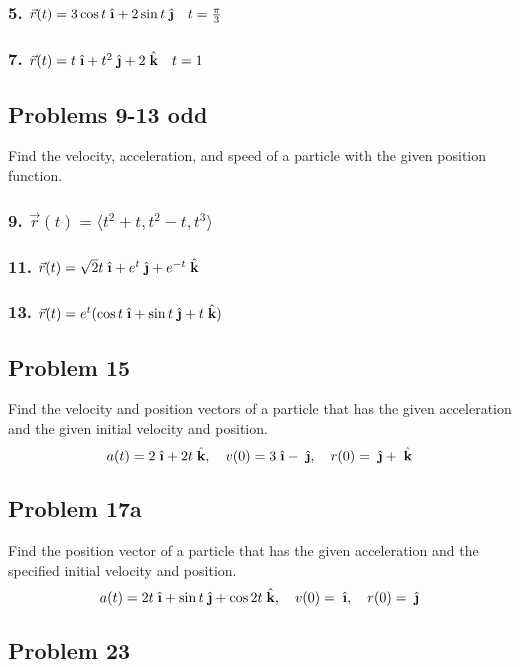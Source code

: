 \documentclass{article}
\newcommand{\ihat}{\;\hat{\textbf{\i}}}
\newcommand{\jhat}{\;\hat{\textbf{\j}}}
\newcommand{\khat}{\;\hat{\textbf{k}}}
\newcommand{\rvec}{\vec{r}(t)}
\begin{document}
\subsubsection*{5. $\rvec = 3 \cos t \ihat + 2 \sin t \jhat \quad t = \frac \pi 3 $}
\subsubsection*{7. $\rvec = t\ihat + t^2\jhat + 2\khat \quad t = 1$}
\subsection*{Problems 9-13 odd}
        
Find the velocity, acceleration, and speed of a particle with the given position function.

\subsubsection*{9. $\rvec = \langle t^2+ t, t^2 - t, t^3 \rangle $}
\subsubsection*{11. $\rvec = \sqrt 2 t\ihat + e^t\jhat + e^{-t} \khat$}
\subsubsection*{13. $\rvec = e^t(\cos t\ihat + \sin t\jhat + t\khat)$}
\subsection*{Problem 15}

Find the velocity and position vectors of a particle that has the given acceleration and the given initial velocity and position.
\[
    a(t) = 2\ihat + 2t\khat, \quad v(0) = 3\ihat - \jhat, \quad r(0) = \jhat + \khat
\]

\subsection*{Problem 17a}

Find the position vector of a particle that has the given acceleration and the specified initial velocity and position.
\[
    a(t) = 2t\ihat + \sin t\jhat + \cos 2t\khat, \quad v(0) = \ihat, \quad r(0) = \jhat
\]

\subsection*{Problem 23}
\end{document}
